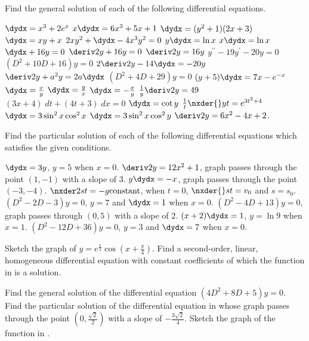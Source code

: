 \begin{exercises}

Find the general solution of each of the following
differential equations.
\begin{exenum}
\x
$\dydx = x^3 + 2e^x$
\x
$x\dydx = 6x^3 +5x +1$
\x
$\dydx = (y^2+1)(2x+3)$
\x
$\dydx = xy + x$
\x
$2xy^2 + \dydx - 4x^3y^2 = 0$
\x
$y\dydx = \ln x$
\x
$x\dydx = \ln x$
\x
$\dydx + 16y = 0$
\x
$\deriv2y + 16y = 0$
\x
$\deriv2y = 16y$
\x
$y^{\prime\prime} - 19y^{\prime} - 20y = 0$
\x
$(D^2 + 10D + 16)y = 0$
\x
$2\deriv2y - 14\dydx = -20y$
\x
$\deriv2y + a^2y = 2a\dydx$
\x
$(D^2 + 4D + 29)y = 0$
\x
$(y+5)\dydx = 7x - e^{-x}$
\x
$\dydx = \frac xy$
\x
$\dydx = \frac yx$
\x
$\dydx = -\frac xy$
\x
$\frac1y \deriv2y = 49$
\x
$(3x+4)\;dt + (4t+3)\;dx = 0$
\x
$\dydx = \cot y$
\x
$\frac1t \nxder{}yt = e^{3t^2+4}$
\x
$\dydx = 3 \sin^2 x \cos^2 x$
\x
$\dydx = 3 \sin^2 x \cos^2 y$
\x
$\deriv2y = 6x^2 - 4x + 2$.
\end{exenum}

Find the particular solution of each of the following
differential equations which satisfies the given
conditions.
\begin{exenum}
\x
$\dydx = 3y$, \quad $y=5$ when $x=0$.
\x
$\deriv2y = 12x^2+1$, \quad graph passes through
the point $(1,-1)$ with a slope of $3$.
\x
$y\dydx = -x$, \quad graph passes through the
point $(-3,-4)$.
\x
$\nxder2st = -g \mbox{constant}$, \quad
when $t=0$, $\nxder{}st = v_0$ and $s=s_0$.
\x
$(D^2-2D-3)y = 0$, \quad $y=7$ and $\dydx = 1$
when $x=0$.
\x
$(D^2-4D+13)y = 0$, \quad
graph passes through $(0,5)$ with a slope of $2$.
\x
$(x+2)\dydx = 1$, \quad $y=\ln 9$ when $x=1$.
\x
$(D^2-12D+36)y=0$, \quad
$y=3$ and $\dydx=7$ when $x=0$.
\end{exenum}

\begin{exenum}
\x
{}
Sketch the graph of $y=e^{\frac x2} \cos
\left(x+\frac\pi4\right)$.
\x
Find a second-order, linear, homogeneous differential
equation with constant coefficients of which the
function in  is a solution.
\end{exenum}

\begin{exenum}
\x
{}
Find the general solution of the differential equation
$(4D^2+8D+5)y = 0$.
\x
{}
Find the particular solution of the differential equation in
 whose graph passes through the point
$\left(0, \frac{\sqrt2}2\right)$ with a slope of $-\frac{3\sqrt2}4$.
\x
Sketch the graph of the function in .
\end{exenum}


\end{exercises}
